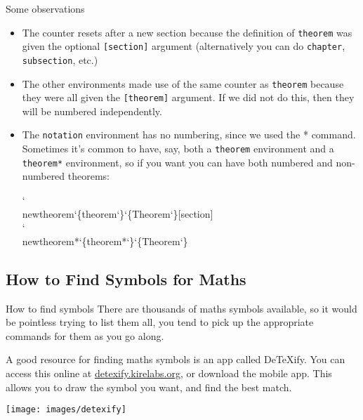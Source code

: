 \documentclass{beamer}
\begin{document}
    \begin{frame}{Some observations}
        \begin{itemize}
            \item The counter resets after a new section because the definition of \texttt{theorem} was given the optional \texttt{[section]} argument (alternatively you can do \texttt{chapter}, \texttt{subsection}, etc.)
            \medskip
            \item The other environments made use of the same counter as \texttt{theorem} because they were all given the \texttt{[theorem]} argument. If we did not do this, then they will be numbered independently.
            \medskip
            \item The \texttt{notation} environment has no numbering, since we used the {*} command. Sometimes it's common to have, say, both a \texttt{theorem} environment and a \texttt{theorem*} environment, so if you want you can have both numbered and non-numbered theorems:
            \begin{center}
                \begin{minipage}{8cm}
                    \ttfamily
                    {\color{red!60!black}\char`\\newtheorem}\char`\{theorem\char`\}\char`\{Theorem\char`\}[section]\\
                    {\color{red!60!black}\char`\\newtheorem}*\char`\{theorem*\char`\}\char`\{Theorem\char`\} 
                \end{minipage}
            \end{center}
        \end{itemize}
    \end{frame}

    \subsection{How to Find Symbols for Maths}
    \begin{frame}{How to find symbols}
        There are thousands of maths symbols available, so it would be pointless trying to list them all, you tend to pick up the appropriate commands for them as you go along.
        
        \medskip
        A good resource for finding maths symbols is an app called De\TeX ify. You can access this online at \href{https://detexify.kirelabs.org}{\ttfamily detexify.kirelabs.org}, or download the mobile app. This allows you to draw the symbol you want, and find the best match.
        
        \begin{center}
            \texttt{[image: images/detexify]}
        \end{center}
    \end{frame}
\end{document}
